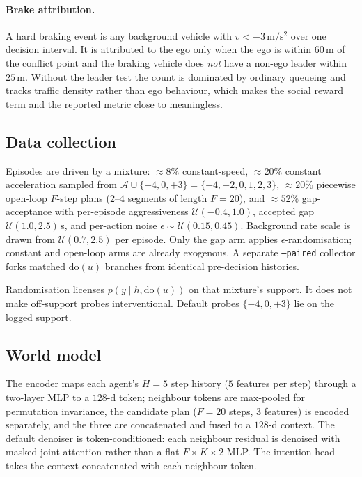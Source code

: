 \documentclass[conference]{IEEEtran}
\begin{document}
\paragraph{Brake attribution.} A hard braking event is any background vehicle
with $\dot v < -3\,\mathrm{m/s^2}$ over one decision interval. It is attributed
to the ego only when the ego is within $60$\,m of the conflict point and the
braking vehicle does \emph{not} have a non-ego leader within $25$\,m. Without the
leader test the count is dominated by ordinary queueing and tracks traffic
density rather than ego behaviour, which makes the social reward term and the
reported metric close to meaningless.

\subsection{Data collection}

Episodes are driven by a mixture: $\approx 8\%$ constant-speed, $\approx 20\%$
constant acceleration sampled from
$\mathcal{A}\cup\{-4,0,+3\}=\{-4,-2,0,1,2,3\}$, $\approx 20\%$ piecewise
open-loop $F$-step plans ($2$--$4$ segments of length $F{=}20$), and
$\approx 52\%$ gap-acceptance with per-episode aggressiveness
$\mathcal{U}(-0.4, 1.0)$, accepted gap $\mathcal{U}(1.0, 2.5)$\,s, and
per-action noise $\epsilon\sim\mathcal{U}(0.15,0.45)$. Background rate scale is
drawn from $\mathcal{U}(0.7, 2.5)$ per episode. Only the gap arm applies
$\epsilon$-randomisation; constant and open-loop arms are already exogenous.
A separate \texttt{--paired} collector forks matched $\mathrm{do}(u)$ branches
from identical pre-decision histories.

Randomisation licenses $p(y \mid h, \mathrm{do}(u))$ on that mixture's support.
It does not make off-support probes interventional. Default probes
$\{-4,0,+3\}$ lie on the logged support.

\subsection{World model}

The encoder maps each agent's $H=5$ step history ($5$ features per step) through
a two-layer MLP to a $128$-d token; neighbour tokens are max-pooled for
permutation invariance, the candidate plan ($F=20$ steps, $3$ features) is
encoded separately, and the three are concatenated and fused to a $128$-d
context. The default denoiser is token-conditioned: each neighbour residual is
denoised with masked joint attention rather than a flat
$F \times K \times 2$ MLP. The intention head takes the context concatenated
with each neighbour token.
\end{document}
